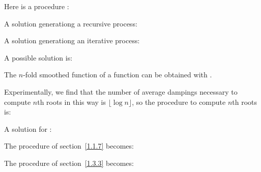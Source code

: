 \begin{exe}[1.42]
    Here is a procedure :
\end{exe}

\begin{exe}[1.43]
    \label{1.43}
    A solution generationg a recursive process:

    A solution generationg an iterative process:
\end{exe}

\begin{exe}[1.44]
    A possible solution is:

    The $n$-fold smoothed function of a function  can be obtained with
    .
\end{exe}

\begin{exe}[1.45]
    Experimentally, we find that the number of average dampings necessary to 
    compute $n$th roots in this way is $\lfloor \log n \rfloor$, so the 
    procedure to compute $n$th roots is:
\end{exe}

\begin{exe}[1.46]
    A solution for :

    The  procedure of section~\ref{1.1.7} becomes:

    The  procedure of section~\ref{1.3.3} becomes:
\end{exe}

